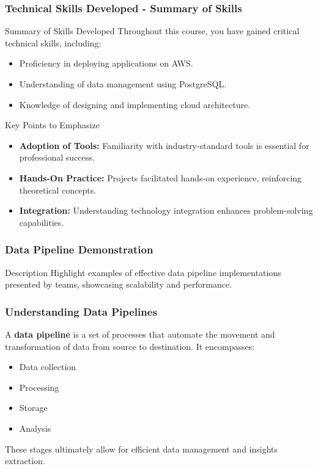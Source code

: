 \documentclass[aspectratio=169]{beamer}
\begin{document}
\begin{frame}[fragile]
    \frametitle{Technical Skills Developed - Summary of Skills}
    \begin{block}{Summary of Skills Developed}
        Throughout this course, you have gained critical technical skills, including:
        \begin{itemize}
            \item Proficiency in deploying applications on AWS.
            \item Understanding of data management using PostgreSQL.
            \item Knowledge of designing and implementing cloud architecture.
        \end{itemize}
    \end{block}
    
    \begin{block}{Key Points to Emphasize}
        \begin{itemize}
            \item \textbf{Adoption of Tools:} Familiarity with industry-standard tools is essential for professional success.
            \item \textbf{Hands-On Practice:} Projects facilitated hands-on experience, reinforcing theoretical concepts.
            \item \textbf{Integration:} Understanding technology integration enhances problem-solving capabilities.
        \end{itemize}
    \end{block}
\end{frame}

\begin{frame}
    \frametitle{Data Pipeline Demonstration}
    \begin{block}{Description}
        Highlight examples of effective data pipeline implementations presented by teams, showcasing scalability and performance.
    \end{block}
\end{frame}

\begin{frame}
    \frametitle{Understanding Data Pipelines}
    A \textbf{data pipeline} is a set of processes that automate the movement and transformation of data from source to destination. It encompasses:
    \begin{itemize}
        \item Data collection
        \item Processing
        \item Storage
        \item Analysis
    \end{itemize}
    These stages ultimately allow for efficient data management and insights extraction.
\end{frame}
\end{document}
